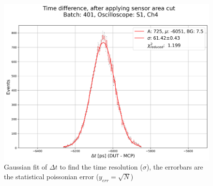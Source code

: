\begin{figure}
    \centering
    \includegraphics[width=0.7\linewidth]{Images/time_resolution_plots/time_difference_401_S1_zoomed_and_gauss_fit_with_cuts_central_area_DUTs_3.png}
    \caption{Gaussian fit of $\Delta t$ to find the time resolution ($\sigma$), the errorbars are the statistical poissonian error ($y_{err}=\sqrt{N}$)}
    \label{fig:time_resolution_plot}
\end{figure}


